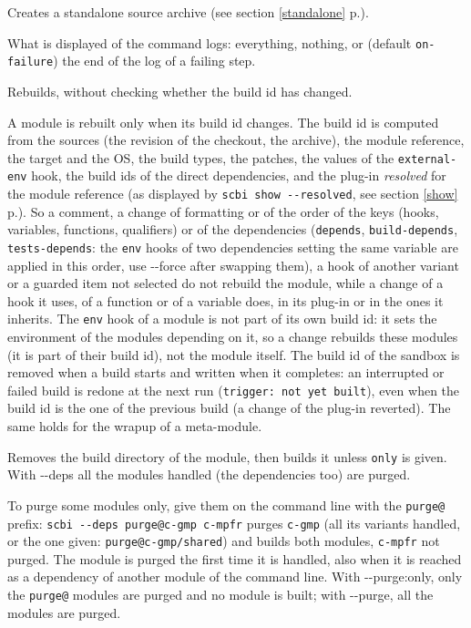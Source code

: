 \documentclass[a4paper,12pt,twoside]{article}
\newcommand{\code}[1]{\texttt{#1}}
\renewcommand{\emph}[1]{\textit{#1}}
\newcommand{\seeref}[1]{see section \ref{#1} p.\pageref{#1}}
\newcommand{\ddash}{-{}-}
\begin{document}
\begin{description}[font=\texttt]
	\item[\ddash{}standalone] Creates a standalone source archive (\seeref{standalone}).

	\item[-l | \ddash{}log:{[}yes|no|on-failure{]}] What is displayed of the command logs: everything, nothing, or (default \code{on-failure}) the end of the log of a failing step.

	\item[-f | \ddash{}force] Rebuilds, without checking whether the build id has changed.

	A module is rebuilt only when its build id changes. The build id is computed from the sources (the revision of the checkout, the archive), the module reference, the target and the OS, the build types, the patches, the values of the \code{external-env} hook, the build ids of the direct dependencies, and the plug-in \emph{resolved} for the module reference (as displayed by \code{scbi show \ddash{}resolved}, \seeref{show}). So a comment, a change of formatting or of the order of the keys (hooks, variables, functions, qualifiers) or of the dependencies (\code{depends}, \code{build-depends}, \code{tests-depends}: the \code{env} hooks of two dependencies setting the same variable are applied in this order, use \ddash{}force after swapping them), a hook of another variant or a guarded item not selected do not rebuild the module, while a change of a hook it uses, of a function or of a variable does, in its plug-in or in the ones it inherits. The \code{env} hook of a module is not part of its own build id: it sets the environment of the modules depending on it, so a change rebuilds these modules (it is part of their build id), not the module itself. The build id of the sandbox is removed when a build starts and written when it completes: an interrupted or failed build is redone at the next run (\code{trigger: not yet built}), even when the build id is the one of the previous build (a change of the plug-in reverted). The same holds for the wrapup of a meta-module.

	\item[-p | \ddash{}purge{[:only]}] Removes the build directory of the module, then builds it unless \code{only} is given. With \ddash{}deps all the modules handled (the dependencies too) are purged.

	\label{purge-prefix}To purge some modules only, give them on the command line with the \code{purge@} prefix: \code{scbi \ddash{}deps purge@c-gmp c-mpfr} purges \code{c-gmp} (all its variants handled, or the one given: \code{purge@c-gmp/shared}) and builds both modules, \code{c-mpfr} not purged. The module is purged the first time it is handled, also when it is reached as a dependency of another module of the command line. With \ddash{}purge:only, only the \code{purge@} modules are purged and no module is built; with \ddash{}purge, all the modules are purged.


\end{description}
\end{document}
